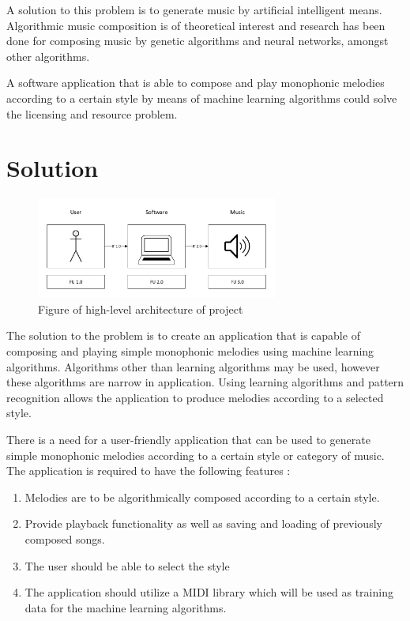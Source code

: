 A solution to this problem is to generate music by artificial intelligent means. 
Algorithmic music composition is of theoretical interest and research has been done for composing music by genetic algorithms and neural networks, amongst other algorithms.

A software application that is able to compose and play monophonic melodies according to a certain style by means of machine learning algorithms could solve the licensing and resource problem.

\section{Solution}
\begin{figure}
\centerline{\includegraphics[width=300px]{../images/arch.pdf}}
\caption{Figure of high-level architecture of project}
\label{ims:archm}
\end{figure}

The solution to the problem is to create an application that is capable of composing and playing simple monophonic melodies using machine learning algorithms. Algorithms other than learning algorithms may be used, however these algorithms are narrow in application. Using learning algorithms and pattern recognition allows the application to produce melodies according to a selected style.

There is a need for a user-friendly application that can be used to generate simple monophonic melodies according to a certain style or category of music.
The application is required to have the following features :
\begin{enumerate}
\item Melodies are to be algorithmically composed according to a certain style.
\item Provide playback functionality as well as saving and loading of previously composed songs.
\item The user should be able to select the style
\item The application should utilize a \acs{MIDI} library which will be used as training data for the machine learning algorithms.
\end{enumerate}

